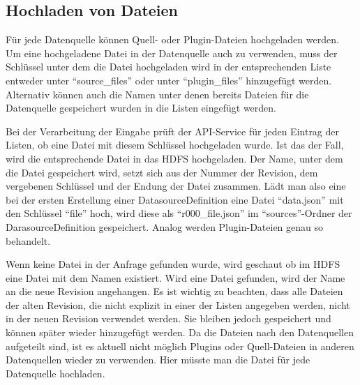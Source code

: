\subsection{Hochladen von Dateien}

Für jede Datenquelle können Quell- oder Plugin-Dateien hochgeladen werden.
Um eine hochgeladene Datei in der Datenquelle auch zu verwenden, muss der Schlüssel unter dem die Datei hochgeladen wird in der entsprechenden Liste entweder unter "`source\_files"' oder unter "`plugin\_files"' hinzugefügt werden.
Alternativ können auch die Namen unter denen bereits Dateien für die Datenquelle gespeichert wurden in die Listen eingefügt werden.

Bei der Verarbeitung der Eingabe prüft der API-Service für jeden Eintrag der Listen, ob eine Datei mit diesem Schlüssel hochgeladen wurde.
Ist das der Fall, wird die entsprechende Datei in das HDFS hochgeladen.
Der Name, unter dem die Datei gespeichert wird, setzt sich aus der Nummer der Revision, dem vergebenen Schlüssel und der Endung der Datei zusammen.
Lädt man also eine bei der ersten Erstellung einer DatasourceDefinition eine Datei "`data.json"' mit den Schlüssel "`file"' hoch, wird diese als "`r000\_file.json"' im "`sources"'-Ordner der DarasourceDefinition gespeichert.
Analog werden Plugin-Dateien genau so behandelt.

Wenn keine Datei in der Anfrage gefunden wurde, wird geschaut ob im HDFS eine Datei mit dem Namen existiert.
Wird eine Datei gefunden, wird der Name an die neue Revision angehangen.
Es ist wichtig zu beachten, dass alle Dateien der alten Revision, die nicht explizit in einer der Listen angegeben werden, nicht in der neuen Revision verwendet werden.
Sie bleiben jedoch gespeichert und können später wieder hinzugefügt werden.
Da die Dateien nach den Datenquellen aufgeteilt sind, ist es aktuell nicht möglich Plugins oder Quell-Dateien in anderen Datenquellen wieder zu verwenden.
Hier müsste man die Datei für jede Datenquelle hochladen.
